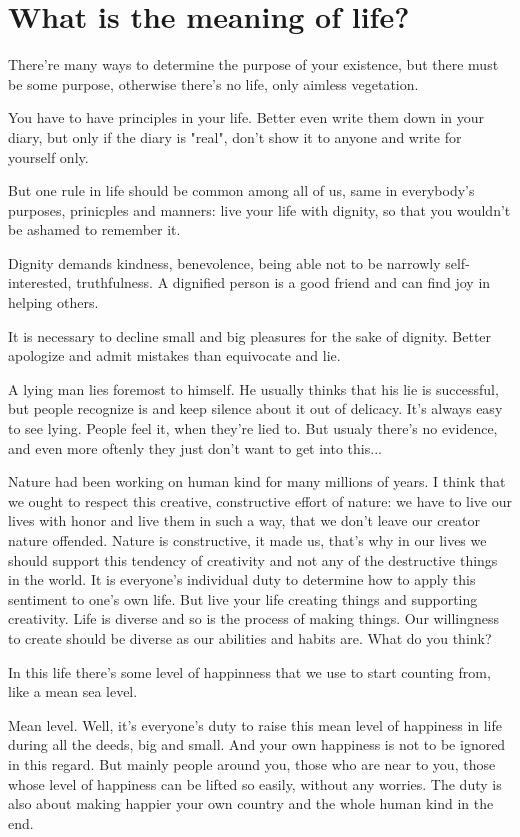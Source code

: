 \chapter{What is the meaning of life?}

There're many ways to determine the purpose of your existence, but there must be some purpose, otherwise there's no life, only aimless vegetation.

You have to have principles in your life. Better even write them down in your diary, but only if the diary is "real", don't show it to anyone and write for yourself only.

But one rule in life should be common among all of us, same in everybody's purposes, prinicples and manners: live your life with dignity, so that you wouldn't be ashamed to remember it.

Dignity demands kindness, benevolence, being able not to be narrowly self-interested, truthfulness. A dignified person is a good friend and can find joy in helping others.

It is necessary to decline small and big pleasures for the sake of dignity. Better apologize and admit mistakes than equivocate and lie.

A lying man lies foremost to himself. He usually thinks that his lie is successful, but people recognize is and keep silence about it out of delicacy. It's always easy to see lying. People feel it, when they're lied to. But usualy there's no evidence, and even more oftenly they just don't want to get into this...

Nature had been working on human kind for many millions of years. I think that we ought to respect this creative, constructive effort of nature: we have to live our lives with honor and live them in such a way, that we don't leave our creator nature offended. Nature is constructive, it made us, that's why in our lives we should support this tendency of creativity and not any of the destructive things in the world. It is everyone's individual duty to determine how to apply this sentiment to one's own life. But live your life creating things and supporting creativity. Life is diverse and so is the process of making things. Our willingness to create should be diverse as our abilities and habits are. What do you think?

In this life there's some level of happinness that we use to start counting from, like a mean sea level.

Mean level. Well, it's everyone's duty to raise this mean level of happiness in life during all the deeds, big and small. And your own happiness is not to be ignored in this regard. But mainly people around you, those who are near to you, those whose level of happiness can be lifted so easily, without any worries. The duty is also about making happier your own country and the whole human kind in the end.

